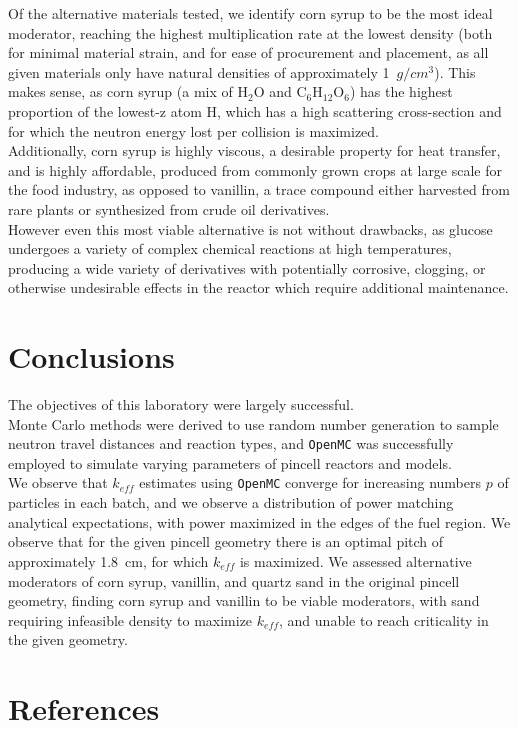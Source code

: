 \documentclass[11pt]{article} %
\begin{document}
Of the alternative materials tested, we identify corn syrup to be the most ideal moderator, reaching the highest multiplication rate at the lowest density (both for minimal material strain, and for ease of procurement and placement, as all given materials only have natural densities of approximately 1~$g/cm^3$).
This makes sense, as corn syrup (a mix of H$_2$O and $\mathrm{C_6H_{12}O_6}$) has the highest proportion of the lowest-z atom H, which has a high scattering cross-section and for which the neutron energy lost per collision is maximized.\\

Additionally, corn syrup is highly viscous, a desirable property for heat transfer, and is highly affordable, produced from commonly grown crops at large scale for the food industry, as opposed to vanillin, a trace compound either harvested from rare plants or synthesized from crude oil derivatives.\\

However even this most viable alternative is not without drawbacks, as glucose undergoes a variety of complex chemical reactions at high temperatures, producing a wide variety of derivatives with potentially corrosive, clogging, or otherwise undesirable effects in the reactor which require additional maintenance.

\FloatBarrier
\clearpage
\section{Conclusions}
The objectives of this laboratory were largely successful.\\

Monte Carlo methods were derived to use random number generation to sample neutron travel distances and reaction types, and \texttt{OpenMC} was successfully employed to simulate varying parameters of pincell reactors and models.\\

We observe that $k_{eff}$ estimates using \texttt{OpenMC} converge for increasing numbers $p$ of particles in each batch, and we observe a distribution of power matching analytical expectations, with power maximized in the edges of the fuel region.
We observe that for the given pincell geometry there is an optimal pitch of approximately 1.8~cm, for which $k_{eff}$ is maximized.
We assessed alternative moderators of corn syrup, vanillin, and quartz sand in the original pincell geometry, finding corn syrup and vanillin to be viable moderators, with sand requiring infeasible density to maximize $k_{eff}$, and unable to reach criticality in the given geometry.

\clearpage
\section{References}\label{sec:References}
\printbibliography[heading=none]
\end{document}
